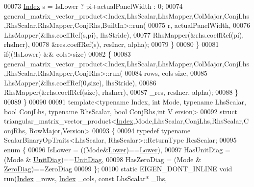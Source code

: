 \begin{DoxyCode}
00073         \hyperlink{namespace_eigen_a62e77e0933482dafde8fe197d9a2cfde}{Index} s = IsLower ? pi+actualPanelWidth : 0;
00074         
      general\_matrix\_vector\_product<Index,LhsScalar,LhsMapper,ColMajor,ConjLhs,RhsScalar,RhsMapper,ConjRhs,BuiltIn>::run(
00075             r, actualPanelWidth,
00076             LhsMapper(&lhs.coeffRef(s,pi), lhsStride),
00077             RhsMapper(&rhs.coeffRef(pi), rhsIncr),
00078             &res.coeffRef(s), resIncr, alpha);
00079       \}
00080     \}
00081     \textcolor{keywordflow}{if}((!IsLower) && cols>size)
00082     \{
00083       
      general\_matrix\_vector\_product<Index,LhsScalar,LhsMapper,ColMajor,ConjLhs,RhsScalar,RhsMapper,ConjRhs>::run(
00084           rows, cols-size,
00085           LhsMapper(&lhs.coeffRef(0,size), lhsStride),
00086           RhsMapper(&rhs.coeffRef(size), rhsIncr),
00087           \_res, resIncr, alpha);
00088     \}
00089   \}
00090 
00091 \textcolor{keyword}{template}<\textcolor{keyword}{typename} Index, \textcolor{keywordtype}{int} Mode, \textcolor{keyword}{typename} LhsScalar, \textcolor{keywordtype}{bool} ConjLhs, \textcolor{keyword}{typename} RhsScalar, \textcolor{keywordtype}{bool} ConjRhs,\textcolor{keywordtype}{int} V
      ersion>
00092 \textcolor{keyword}{struct }triangular\_matrix\_vector\_product<\hyperlink{namespace_eigen_a62e77e0933482dafde8fe197d9a2cfde}{Index},Mode,LhsScalar,ConjLhs,RhsScalar,ConjRhs,
      \hyperlink{group__enums_ggaacded1a18ae58b0f554751f6cdf9eb13acfcde9cd8677c5f7caf6bd603666aae3}{RowMajor},Version>
00093 \{
00094   \textcolor{keyword}{typedef} \textcolor{keyword}{typename} ScalarBinaryOpTraits<LhsScalar, RhsScalar>::ReturnType ResScalar;
00095   \textcolor{keyword}{enum} \{
00096     IsLower = ((Mode&\hyperlink{group__enums_gga39e3366ff5554d731e7dc8bb642f83cda891792b8ed394f7607ab16dd716f60e6}{Lower})==\hyperlink{group__enums_gga39e3366ff5554d731e7dc8bb642f83cda891792b8ed394f7607ab16dd716f60e6}{Lower}),
00097     HasUnitDiag = (Mode & \hyperlink{group__enums_gga39e3366ff5554d731e7dc8bb642f83cdaddb72f888ac85d5a1c52333e54f9374b}{UnitDiag})==\hyperlink{group__enums_gga39e3366ff5554d731e7dc8bb642f83cdaddb72f888ac85d5a1c52333e54f9374b}{UnitDiag},
00098     HasZeroDiag = (Mode & \hyperlink{group__enums_gga39e3366ff5554d731e7dc8bb642f83cda884ff7240392e85aa6e4b3c957e36483}{ZeroDiag})==ZeroDiag
00099   \};
00100   \textcolor{keyword}{static} EIGEN\_DONT\_INLINE \textcolor{keywordtype}{void} run(\hyperlink{namespace_eigen_a62e77e0933482dafde8fe197d9a2cfde}{Index} \_rows, \hyperlink{namespace_eigen_a62e77e0933482dafde8fe197d9a2cfde}{Index} \_cols, \textcolor{keyword}{const} LhsScalar* \_lhs, 

\end{DoxyCode}

